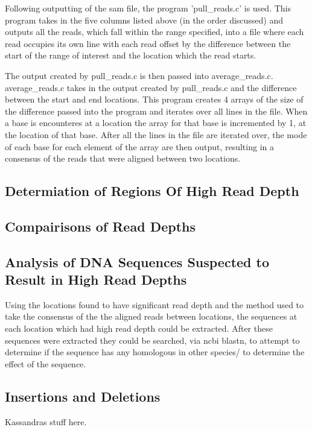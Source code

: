 \documentclass[../main.tex]{subfiles}
\begin{document}
	Following outputting of the sam file, the program 'pull\_reads.c' is used. This program takes in the five columns listed above (in the order discussed) and outputs all the reads, which fall within the range specified, into a file where each read occupies its own line with each read offset by the difference between the start of the range of interest and the location which the read starts.
	
	The output created by pull\_reads.c is then passed into average\_reads.c. average\_reads.c takes in the output created by pull\_reads.c and the difference between the start and end locations. This program creates 4 arrays of the size of the difference passed into the program and iterates over all lines in the file. When a base is encounteres at a location the array for that base is incremented by 1, at the location of that base. After all the lines in the file are iterated over, the mode of each base for each element of the array are then output, resulting in a consensus of the reads that were aligned between two locations.

\subsection{Determiation of Regions Of High Read Depth}

\subsection{Compairisons of Read Depths}
	

\subsection{Analysis of DNA Sequences Suspected to Result in High Read Depths}
	Using the locations found to have significant read depth and the method used to take the consensus of the the aligned reads between locations, the sequences at each location which had high read depth could be extracted. After these sequences were extracted they could be searched, via ncbi blastn, to attempt to determine if the sequence has any homologous in other species/ to determine the effect of the sequence.

\subsection{Insertions and Deletions}

	Kassandras stuff here.
\end{document}
